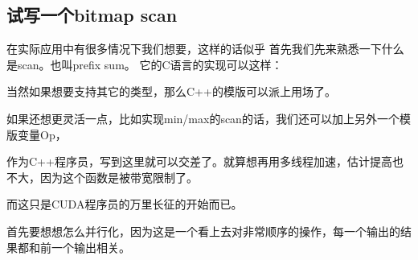 \subsection{试写一个bitmap scan}

在实际应用中有很多情况下我们想要，这样的话似乎
首先我们先来熟悉一下什么是scan。也叫prefix sum。
它的C语言的实现可以这样：

\myvspace


当然如果想要支持其它的类型，那么C++的模版可以派上用场了。
\myvspace

如果还想更灵活一点，比如实现min/max的scan的话，我们还可以加上另外一个模版变量Op，
\myvspace


作为C++程序员，写到这里就可以交差了。就算想再用多线程加速，估计提高也不大，因为这个函数是被带宽限制了。

而这只是CUDA程序员的万里长征的开始而已。

首先要想想怎么并行化，因为这是一个看上去对非常顺序的操作，每一个输出的结果都和前一个输出相关。

%
